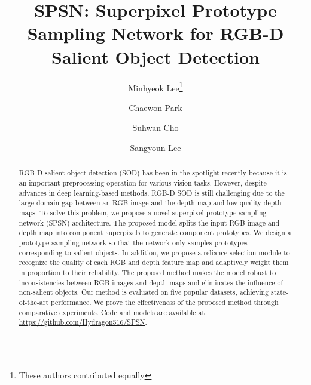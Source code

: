 \documentclass[runningheads]{llncs}
\begin{document}
\pagestyle{headings}
	\mainmatter
	\def\ECCVSubNumber{5940}  

	\title{SPSN: Superpixel Prototype Sampling Network for RGB-D Salient Object Detection} 

\begin{comment}
		\titlerunning{ECCV-20 submission ID \ECCVSubNumber} 
		\authorrunning{ECCV-20 submission ID \ECCVSubNumber} 
		\author{Anonymous ECCV submission}
		\institute{Paper ID \ECCVSubNumber}
	\end{comment}


\author{Minhyeok Lee\thanks{These authors contributed equally} \and
		Chaewon Park\inst{\star} \and
		Suhwan Cho \and
		Sangyoun Lee}
\maketitle
	
	\begin{abstract}
		RGB-D salient object detection (SOD) has been in the spotlight recently because it is an important preprocessing operation for various vision tasks. However, despite advances in deep learning-based methods, RGB-D SOD is still challenging due to the large domain gap between an RGB image and the depth map and low-quality depth maps. To solve this problem, we propose a novel superpixel prototype sampling network (SPSN) architecture. The proposed model splits the input RGB image and depth map into component superpixels to generate component prototypes. We design a prototype sampling network so that the network only samples prototypes corresponding to salient objects. In addition, we propose a reliance selection module to recognize the quality of each RGB and depth feature map and adaptively weight them in proportion to their reliability. The proposed method makes the model robust to inconsistencies between RGB images and depth maps and eliminates the influence of non-salient objects. Our method is evaluated on five popular datasets, achieving state-of-the-art performance. We prove the effectiveness of the proposed method through comparative experiments. Code and models are available at \url{https://github.com/Hydragon516/SPSN}.
		
	\end{abstract}
	
\end{document}
